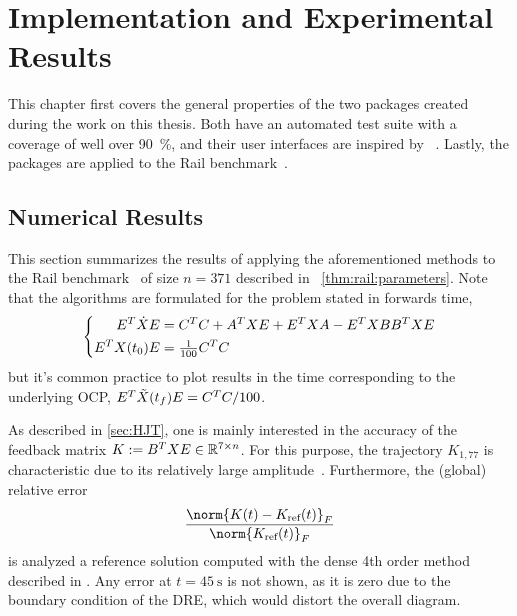 \chapter{Implementation and Experimental Results}
\label{sec:impl}

This chapter first covers the general properties of the two packages created during the work on this thesis.
Both have an automated test suite with a coverage of well over \SI{90}{\percent},
and their user interfaces are inspired by ~\cite{DifferentialEquations}.
Lastly, the packages are applied to
the Rail benchmark~\cite{morwiki_steel}.




\section{Numerical Results}

This section summarizes the results of applying the aforementioned methods to
the Rail benchmark~\cite{morwiki_steel} of size $n=371$
described in \eg~\autoref{thm:rail:parameters}.
Note that the algorithms are formulated for the problem stated in forwards time,
\begin{equation}
\left\{
\begin{aligned}
  E^T \dot X E &= C^T C + A^T X E + E^T X A - E^T X BB^T X E \\
  E^T X(t_0) E &= \tfrac{1}{100} C^T C
\end{aligned}
\right.
\end{equation}
but it's common practice to plot results in the time corresponding to the underlying \ac{OCP},
\ie $E^T \tilde X(t_f) E = C^T C/100$.

As described in \autoref{sec:HJT},
one is mainly interested in the accuracy of the feedback matrix
$
  K := B^T X E \in \mathbb{R}^{7 \times n}
$.
For this purpose, the trajectory $K_{1,77}$ is characteristic due to its relatively large amplitude~\cite{Lang2015}.
Furthermore, the (global) relative error
\begin{equation}
\label{eq:results:err:ref}
  \frac{\norm{K(t) - K_\text{ref}(t)}_F}{\norm{K_\text{ref}(t)}_F}
\end{equation}
is analyzed \wrt a reference solution computed with the dense 4th order method described in \cite[Appendix~A]{Lang2017}.
Any error at $t=\SI{45}{\second}$ is not shown,
as it is zero due to the boundary condition of the \ac{DRE},
which would distort the overall diagram.

